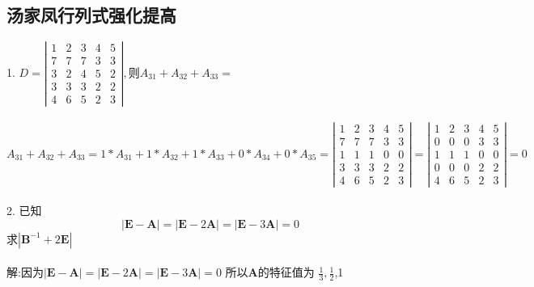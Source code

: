 \documentclass[12pt]{article}
\begin{document}
\subsection{汤家凤行列式强化提高}
1. $D=\left|\begin{array}{ccccc}{1} & {2} & {3} & {4} & {5} \\ {7} & {7} & {7} & {3} & {3} \\ {3} & {2} & {4} & {5} & {2} \\ {3} & {3} & {3} & {2} & {2} \\ {4} & {6} & {5} & {2} & {3}\end{array}\right|, \text {则} A_{31}+A_{32}+A_{33}=$ \\ \\
$A_{31}+A_{32}+A_{33}=1*A_{31}+1*A_{32}+1*A_{33}+0*A_{34}+0*A_{35} = \left|\begin{array}{ccccc}{1} & {2} & {3} & {4} & {5} \\ {7} & {7} & {7} & {3} & {3} \\ {1} & {1} & {1} & {0} & {0} \\ {3} & {3} & {3} & {2} & {2} \\ {4} & {6} & {5} & {2} & {3} \end{array}\right| = \left|\begin{array}{lllll}{1} & {2} & {3} & {4} & {5} \\ {0} & {0} & {0} & {3} & {3} \\ {1} & {1} & {1} & {0} & {0} \\ {0} & {0} & {0} & {2} & {2} \\ {4} & {6} & {5} & {2} & {3}\end{array}\right|=0$ \\ \\
2.
已知
\begin{equation}|\boldsymbol{E}-\boldsymbol{A}|=|\boldsymbol{E}-2 \boldsymbol{A}|=|\boldsymbol{E}-3 \boldsymbol{A}|=0
\end{equation}
 求$ \left|\boldsymbol{B}^{-1}+2 \boldsymbol{E}\right|$ \\ \\
解:因为$|\boldsymbol{E}-\boldsymbol{A}|=|\boldsymbol{E}-2 \boldsymbol{A}|=|\boldsymbol{E}-3 \boldsymbol{A}|=0$
所以$\boldsymbol{A}$的特征值为 $\frac{1}{3},\frac{1}{2}$,1
\end{document}
